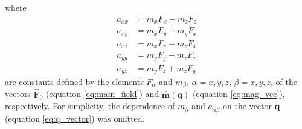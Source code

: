 where
\begin{equation}
\begin{split}
a_{xx} &= m_{x} F_{x} - m_{z} F_{z} \\
a_{xy} &= m_{x} F_{y} + m_{y} F_{x} \\
a_{xz} &= m_{x} F_{z} + m_{z} F_{x} \\
a_{yy} &= m_{y} F_{y} - m_{z} F_{z} \\
a_{yz} &= m_{y} F_{z} + m_{z} F_{y}
\end{split}
\label{eq:a-coefficients}
\end{equation}
are constants defined by the elements $F_{\alpha}$ and $m_{\beta}$, 
$\alpha = x, y, z$, $\beta = x, y, z$, 
of the vectors $\hat{\mathbf{F}}_{0}$ (equation \ref{eq:main_field}) and
$\hat{\mathbf{m}}(\mathbf{q})$ (equation \ref{eq:mag_vec}), respectively.
For simplicity, the dependence of $m_{\beta}$ and $a_{\alpha\beta}$ on the 
vector $\mathbf{q}$ (equation \ref{eq:q_vector}) was omitted.

